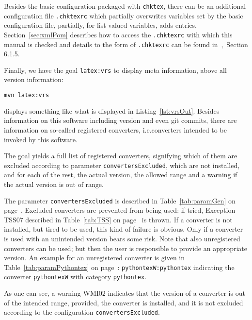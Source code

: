 Besides the basic configuration packaged with \texttt{chktex}, 
there can be an additional configuration file \texttt{.chktexrc} 
which partially overwrites variables set by the basic configuration file, 
partially, for list-valued variables, adds entries. 
Section~\ref{sec:xmlPom} describes how to access the \texttt{.chktexrc} 
with which this manual is checked and 
details to the form of \texttt{.chktexrc} can be found in~\cite{ChkTeX22},~Section 6.1.5.  



Finally, we have the goal \texttt{latex:vrs}
to display meta information, above all version information:
% 
\begin{Verbatim}
mvn latex:vrs
\end{Verbatim}
%
displays something like what is displayed in Listing~\ref{lst:vrsOut}. 
Besides information on this software including version and even git commits, 
there are information on so-called registered converters, 
i.e.\@ converters intended to be invoked by this software. 

The goal yields a full list of registered converters, 
signifying which of them are excluded 
according to parameter \texttt{convertersExcluded}, 
which are not installed, 
and for each of the rest, the actual version, the allowed range 
and a warning if the actual version is out of range. 

The parameter \texttt{convertersExcluded} 
is described in Table~\ref{tab:paramGen} on page~\pageref{tab:paramGen}. 
Excluded converters are prevented from being used: 
if tried, Exception TSS07 
described in Table~\ref{tab:TSS} on page~\pageref{tab:TSS} is thrown. 
If a converter is not installed, but tired to be used, 
this kind of failure is obvious. 
Only if a converter is used with an unintended version bears some risk. 
Note that also unregistered converters can be used; 
but then the user is responsible to provide an appropriate version. 
An example for an unregistered converter 
is given in Table~\ref{tab:paramPythontex} on page~\pageref{tab:paramPythontex}: 
\texttt{pythontexW:pythontex} 
indicating the converter \texttt{pythontexW} with category \texttt{pythontex}. 


As one can see, a warning WMI02 indicates 
that the version of a converter is out of the intended range, 
provided, the converter is installed, and it is not excluded 
according to the configuration \texttt{convertersExcluded}.


